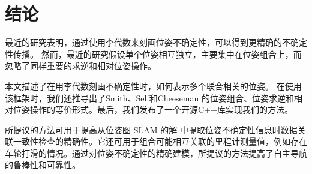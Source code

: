 \section{结论}
\label{sec:conclusion}

最近的研究表明，通过使用李代数来刻画位姿不确定性，可以得到更精确的不确定性传播。 
然而，最近的研究假设单个位姿相互独立，主要集中在位姿组合上，而忽略了同样重要的求逆和相对位姿操作。 

本文描述了在用李代数刻画不确定性时，如何表示多个联合相关的位姿。 
在使用该框架时，我们还推导出了Smith、Self和Cheeseman \cite{smith1990a} 的位姿组合、位姿求逆和相对位姿操作的等价形式。最后，我们发布了一个开源C++库实现我们的方法。 

所提议的方法可用于提高从位姿图 \ac{SLAM} 的解 \cite{jmangelson-2018a} 中提取位姿不确定性信息时数据关联一致性检查的精确性。它还可用于组合可能相互关联的里程计测量值，例如存在车轮打滑的情况。通过对位姿不确定性的精确建模，所提议的方法提高了自主导航的鲁棒性和可靠性。
